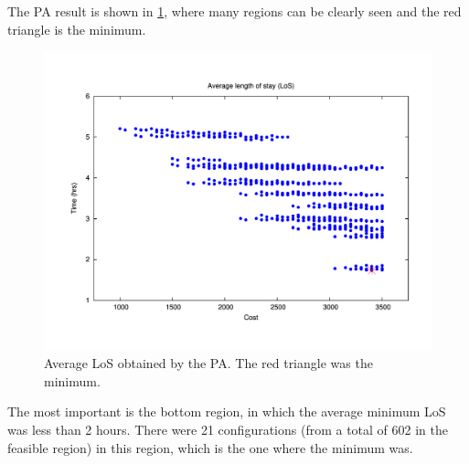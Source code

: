 \documentclass[11pt]{article} %
\begin{document}
The PA result is shown in \ref{subfig:pipe13-1}, where many regions
can be clearly seen and the red triangle is the minimum. 
\begin{figure}[H]
\noindent \begin{centering}
\includegraphics[width=0.95\columnwidth,height=0.25\paperheight]{figs4/v0/6400-602-75-pipe-LoS-min}
\par\end{centering}

\caption{Average LoS obtained by the PA. The red triangle was the minimum.
\label{subfig:pipe13-1}}
\end{figure}
 The most important is the bottom region, in which the average minimum
LoS was less than 2 hours. There were 21 configurations (from a total
of 602 in the feasible region) in this region, which is the one where
the minimum was.
\end{document}
